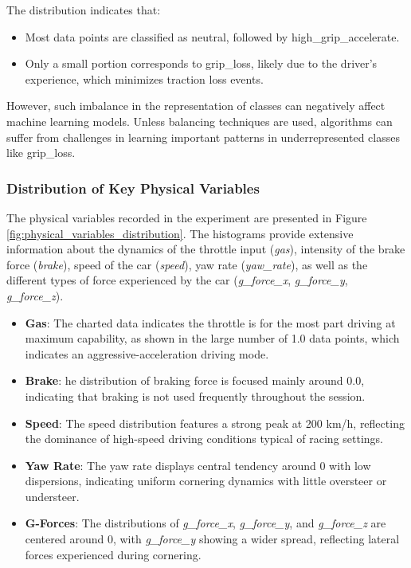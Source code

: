 \documentclass[a4paper,final,12pt]{report}
\begin{document}
The distribution indicates that:
\begin{itemize}
    \item Most data points are classified as neutral, followed by high\_grip\_accelerate.
    \item Only a small portion corresponds to grip\_loss, likely due to the driver's experience, which minimizes traction loss events.
\end{itemize}
However, such imbalance in the representation of classes can negatively affect machine learning models. Unless balancing techniques are used, algorithms can suffer from challenges in learning important patterns in underrepresented classes like grip\_loss.

\subsubsection{Distribution of Key Physical Variables}
The physical variables recorded in the experiment are presented in Figure \ref{fig:physical_variables_distribution}. The histograms provide extensive information about the dynamics of the throttle input (\textit{gas}), intensity of the brake force (\textit{brake}), speed of the car (\textit{speed}), yaw rate (\textit{yaw\_rate}), as well as the different types of force experienced by the car (\textit{g\_force\_x}, \textit{g\_force\_y}, \textit{g\_force\_z}).

\begin{itemize}
    \item \textbf{Gas}: The charted data indicates the throttle is for the most part driving at maximum capability, as shown in the large number of 1.0 data points, which indicates an aggressive-acceleration driving mode.
    \item \textbf{Brake}: he distribution of braking force is focused mainly around 0.0, indicating that braking is not used frequently throughout the session.
    \item \textbf{Speed}:  The speed distribution features a strong peak at 200 km/h, reflecting the dominance of high-speed driving conditions typical of racing settings.
    \item \textbf{Yaw Rate}: The yaw rate displays central tendency around 0 with low dispersions, indicating uniform cornering dynamics with little oversteer or understeer.
    \item \textbf{G-Forces}: The distributions of \textit{g\_force\_x}, \textit{g\_force\_y}, and \textit{g\_force\_z} are centered around 0, with \textit{g\_force\_y} showing a wider spread, reflecting lateral forces experienced during cornering.
\end{itemize}
\end{document}
